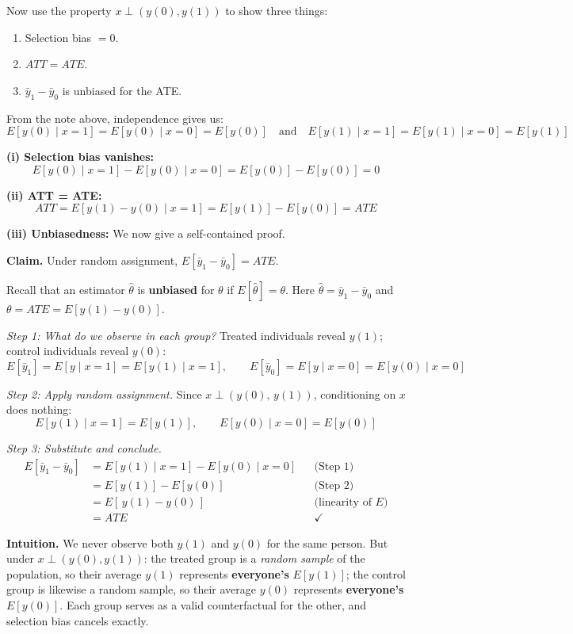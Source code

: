 \documentclass[11pt,a4paper]{article}
\begin{document}
\begin{enumerate}[label=(\alph*)]
Now use the property $x \perp (y(0), y(1))$ to show three things:
\begin{enumerate}[label=(\roman*)]
  \item Selection bias $= 0$.
  \item $ATT = ATE$.
  \item $\bar{y}_1 - \bar{y}_0$ is unbiased for the ATE.
\end{enumerate}

\begin{solution}
From the note above, independence gives us:
\[
  E[y(0) \mid x{=}1] = E[y(0) \mid x{=}0] = E[y(0)]
  \quad\text{and}\quad
  E[y(1) \mid x{=}1] = E[y(1) \mid x{=}0] = E[y(1)]
\]

\textbf{(i) Selection bias vanishes:}
\[
  E[y(0) \mid x{=}1] - E[y(0) \mid x{=}0] = E[y(0)] - E[y(0)] = 0
\]

\textbf{(ii) ATT = ATE:}
\[
  ATT = E[y(1) - y(0) \mid x{=}1] = E[y(1)] - E[y(0)] = ATE
\]

\textbf{(iii) Unbiasedness:} We now give a self-contained proof.

\textbf{Claim.} Under random assignment, $E[\bar{y}_1 - \bar{y}_0] = ATE$.

\smallskip
Recall that an estimator $\hat{\theta}$ is \textbf{unbiased} for $\theta$ if $E[\hat{\theta}] = \theta$. Here $\hat{\theta} = \bar{y}_1 - \bar{y}_0$ and $\theta = ATE = E[y(1) - y(0)]$.

\smallskip
\emph{Step 1: What do we observe in each group?} Treated individuals reveal $y(1)$; control individuals reveal $y(0)$:
\[
  E[\bar{y}_1] = E[y \mid x{=}1] = E[y(1) \mid x{=}1], \qquad
  E[\bar{y}_0] = E[y \mid x{=}0] = E[y(0) \mid x{=}0]
\]

\emph{Step 2: Apply random assignment.} Since $x \perp (y(0),\, y(1))$, conditioning on $x$ does nothing:
\[
  E[y(1) \mid x{=}1] = E[y(1)], \qquad E[y(0) \mid x{=}0] = E[y(0)]
\]

\emph{Step 3: Substitute and conclude.}
\begin{align*}
  E[\bar{y}_1 - \bar{y}_0]
    &= E[y(1) \mid x{=}1] - E[y(0) \mid x{=}0] & &\text{(Step 1)}\\
    &= E[y(1)] - E[y(0)]                    & &\text{(Step 2)}\\
    &= E[\,y(1) - y(0)\,]                   & &\text{(linearity of $E$)}\\
    &= ATE & &\checkmark
\end{align*}

\smallskip
\textbf{Intuition.} We never observe both $y(1)$ and $y(0)$ for the same person. But under $x \perp (y(0), y(1))$: the treated group is a \emph{random sample} of the population, so their average $y(1)$ represents \textbf{everyone's} $E[y(1)]$; the control group is likewise a random sample, so their average $y(0)$ represents \textbf{everyone's} $E[y(0)]$. Each group serves as a valid counterfactual for the other, and selection bias cancels exactly.


\end{solution}
\end{enumerate}
\end{document}
